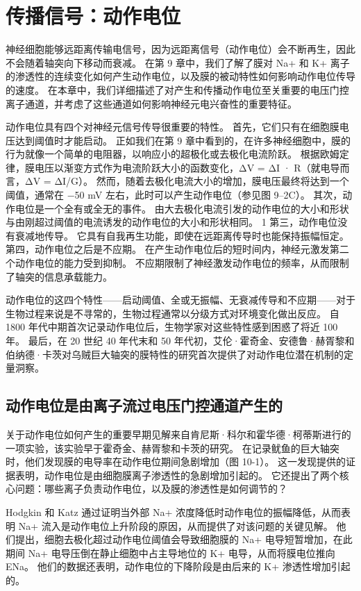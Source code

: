 \chapter{传播信号：动作电位} \label{chap:chap10}
神经细胞能够远距离传输电信号，因为远距离信号（动作电位）会不断再生，因此不会随着轴突向下移动而衰减。 在第 9 章中，我们了解了膜对 Na+ 和 K+ 离子的渗透性的连续变化如何产生动作电位，以及膜的被动特性如何影响动作电位传导的速度。 
在本章中，我们详细描述了对产生和传播动作电位至关重要的电压门控离子通道，并考虑了这些通道如何影响神经元电兴奋性的重要特征。


动作电位具有四个对神经元信号传导很重要的特性。 
首先，它们只有在细胞膜电压达到阈值时才能启动。 
正如我们在第 9 章中看到的，在许多神经细胞中，膜的行为就像一个简单的电阻器，以响应小的超极化或去极化电流阶跃。 
根据欧姆定律，膜电压以渐变方式作为电流阶跃大小的函数变化，ΔV = ΔI · R（就电导而言，ΔV = ΔI/G）。 
然而，随着去极化电流大小的增加，膜电压最终将达到一个阈值，通常在 −50 mV 左右，此时可以产生动作电位（参见图 9–2C）。 
其次，动作电位是一个全有或全无的事件。 
由大去极化电流引发的动作电位的大小和形状与由刚超过阈值的电流诱发的动作电位的大小和形状相同。
1 第三，动作电位没有衰减地传导。 
它具有自我再生功能，即使在远距离传导时也能保持振幅恒定。 
第四，动作电位之后是不应期。 
在产生动作电位后的短时间内，神经元激发第二个动作电位的能力受到抑制。 
不应期限制了神经激发动作电位的频率，从而限制了轴突的信息承载能力。


动作电位的这四个特性——启动阈值、全或无振幅、无衰减传导和不应期——对于生物过程来说是不寻常的，生物过程通常以分级方式对环境变化做出反应。 
自 1800 年代中期首次记录动作电位后，生物学家对这些特性感到困惑了将近 100 年。 
最后，在 20 世纪 40 年代末和 50 年代初，艾伦·霍奇金、安德鲁·赫胥黎和伯纳德·卡茨对乌贼巨大轴突的膜特性的研究首次提供了对动作电位潜在机制的定量洞察。


\section{动作电位是由离子流过电压门控通道产生的}
关于动作电位如何产生的重要早期见解来自肯尼斯·科尔和霍华德·柯蒂斯进行的一项实验，该实验早于霍奇金、赫胥黎和卡茨的研究。 
在记录鱿鱼的巨大轴突时，他们发现膜的电导率在动作电位期间急剧增加（图 10-1）。 
这一发现提供的证据表明，动作电位是由细胞膜离子渗透性的急剧增加引起的。 
它还提出了两个核心问题：哪些离子负责动作电位，以及膜的渗透性是如何调节的？


Hodgkin 和 Katz 通过证明当外部 Na+ 浓度降低时动作电位的振幅降低，从而表明 Na+ 流入是动作电位上升阶段的原因，从而提供了对该问题的关键见解。 
他们提出，细胞去极化超过动作电位阈值会导致细胞膜的 Na+ 电导短暂增加，在此期间 Na+ 电导压倒在静止细胞中占主导地位的 K+ 电导，从而将膜电位推向 ENa。 
他们的数据还表明，动作电位的下降阶段是由后来的 K+ 渗透性增加引起的。


